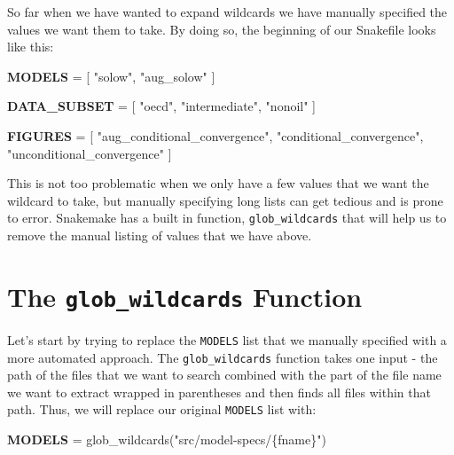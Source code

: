 \documentclass[]{book}
\newenvironment{Shaded}{\begin{snugshade}}{\end{snugshade}}
\newcommand{\KeywordTok}[1]{\textcolor[rgb]{0.13,0.29,0.53}{\textbf{{#1}}}}
\newcommand{\StringTok}[1]{\textcolor[rgb]{0.31,0.60,0.02}{{#1}}}
\newcommand{\NormalTok}[1]{{#1}}
\theoremstyle{definition}
\theoremstyle{definition}
\theoremstyle{definition}
\theoremstyle{remark}
\begin{document}
So far when we have wanted to expand wildcards we have manually
specified the values we want them to take. By doing so, the beginning of
our Snakefile looks like this:

\begin{Shaded}
\begin{Highlighting}[]
\KeywordTok{MODELS} \NormalTok{= [}
          \StringTok{"solow"}\NormalTok{,}
          \StringTok{"aug_solow"}
          \NormalTok{]}

\KeywordTok{DATA_SUBSET} \NormalTok{= [}
                \StringTok{"oecd"}\NormalTok{,}
                \StringTok{"intermediate"}\NormalTok{,}
                \StringTok{"nonoil"}
                \NormalTok{]}

\KeywordTok{FIGURES} \NormalTok{= [}
            \StringTok{"aug_conditional_convergence"}\NormalTok{,}
            \StringTok{"conditional_convergence"}\NormalTok{,}
            \StringTok{"unconditional_convergence"}
            \NormalTok{]}
\end{Highlighting}
\end{Shaded}

This is not too problematic when we only have a few values that we want
the wildcard to take, but manually specifying long lists can get tedious
and is prone to error. Snakemake has a built in function,
\texttt{glob\_wildcards} that will help us to remove the manual listing
of values that we have above.

\section{\texorpdfstring{The \texttt{glob\_wildcards}
Function}{The glob\_wildcards Function}}\label{the-glob_wildcards-function}

Let's start by trying to replace the \texttt{MODELS} list that we
manually specified with a more automated approach. The
\texttt{glob\_wildcards} function takes one input - the path of the
files that we want to search combined with the part of the file name we
want to extract wrapped in parentheses and then finds all files within
that path. Thus, we will replace our original \texttt{MODELS} list with:

\begin{Shaded}
\begin{Highlighting}[]
\KeywordTok{MODELS} \NormalTok{= glob_wildcards(}\StringTok{"src/model-specs/\{fname\}"}\NormalTok{)}
\end{Highlighting}
\end{Shaded}
\end{document}
